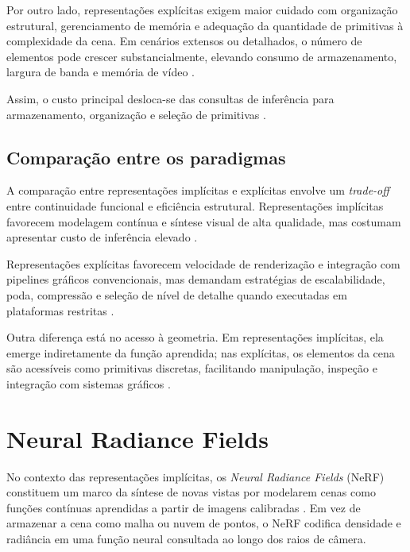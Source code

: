 Por outro lado, representações explícitas exigem maior cuidado com organização estrutural, gerenciamento de memória e adequação da quantidade de primitivas à complexidade da cena. Em cenários extensos ou detalhados, o número de elementos pode crescer substancialmente, elevando consumo de armazenamento, largura de banda e memória de vídeo \cite{fei2025survey3dgs,wu2025,fang2024,huang2025}.

Assim, o custo principal desloca-se das consultas de inferência para armazenamento, organização e seleção de primitivas \cite{mildenhall2020,kerbl2023,fei2025survey3dgs}.

\subsection{Comparação entre os paradigmas}

A comparação entre representações implícitas e explícitas envolve um \textit{trade-off} entre continuidade funcional e eficiência estrutural. Representações implícitas favorecem modelagem contínua e síntese visual de alta qualidade, mas costumam apresentar custo de inferência elevado \cite{sitzmann2019srn,mildenhall2020,muller2022}.

Representações explícitas favorecem velocidade de renderização e integração com pipelines gráficos convencionais, mas demandam estratégias de escalabilidade, poda, compressão e seleção de nível de detalhe quando executadas em plataformas restritas \cite{kerbl2023,fei2025survey3dgs,wu2025,fan2024lightgaussian}.

Outra diferença está no acesso à geometria. Em representações implícitas, ela emerge indiretamente da função aprendida; nas explícitas, os elementos da cena são acessíveis como primitivas discretas, facilitando manipulação, inspeção e integração com sistemas gráficos \cite{sitzmann2019srn,mildenhall2020,kerbl2023,fei2025survey3dgs}.

\section{Neural Radiance Fields}

No contexto das representações implícitas, os \textit{Neural Radiance Fields} (NeRF) constituem um marco da síntese de novas vistas por modelarem cenas como funções contínuas aprendidas a partir de imagens calibradas \cite{sitzmann2019srn,mildenhall2020}. Em vez de armazenar a cena como malha ou nuvem de pontos, o NeRF codifica densidade e radiância em uma função neural consultada ao longo dos raios de câmera.

